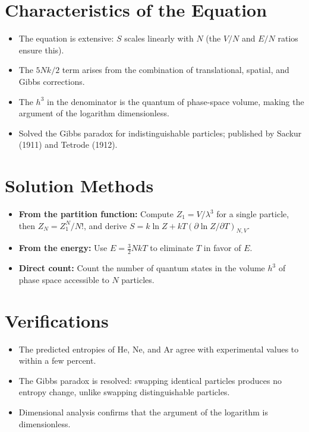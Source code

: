 \section*{Characteristics of the Equation}

\begin{itemize}
    \item The equation is extensive: $S$ scales linearly with $N$ (the $V/N$ and $E/N$ ratios ensure this).
    \item The $5Nk/2$ term arises from the combination of translational, spatial, and Gibbs corrections.
    \item The $h^3$ in the denominator is the quantum of phase-space volume, making the argument of the logarithm dimensionless.
    \item Solved the Gibbs paradox for indistinguishable particles; published by Sackur (1911) and Tetrode (1912).
\end{itemize}
\section*{Solution Methods}

\begin{itemize}
    \item \textbf{From the partition function:} Compute $Z_1 = V/\lambda^3$ for a single particle, then $Z_N = Z_1^N/N!$, and derive $S = k\ln Z + kT(\partial\ln Z/\partial T)_{N,V}$.
    \item \textbf{From the energy:} Use $E = \frac{3}{2}NkT$ to eliminate $T$ in favor of $E$.
    \item \textbf{Direct count:} Count the number of quantum states in the volume $h^3$ of phase space accessible to $N$ particles.
\end{itemize}
\section*{Verifications}

\begin{itemize}
    \item The predicted entropies of He, Ne, and Ar agree with experimental values to within a few percent.
    \item The Gibbs paradox is resolved: swapping identical particles produces no entropy change, unlike swapping distinguishable particles.
    \item Dimensional analysis confirms that the argument of the logarithm is dimensionless.
\end{itemize}
